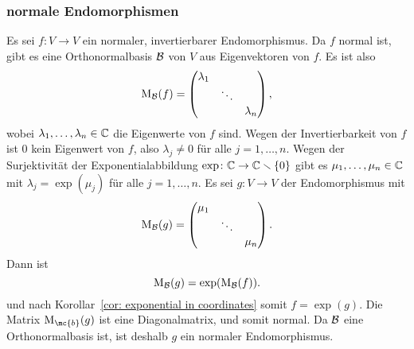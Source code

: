 \documentclass[a4paper, 10pt, numbers=noenddot]{scrartcl}
\begin{document}
\subsubsection{normale Endomorphismen}
Es sei $f \colon V \to V$ ein normaler, invertierbarer Endomorphismus.
Da $f$ normal ist, gibt es eine Orthonormalbasis $\mathcal{B}$ von $V$ aus Eigenvektoren von $f$.
Es ist also
\[
  \operatorname{M}_{\mathcal{B}}(f)
  =
  \begin{pmatrix}
    \lambda_1 &         &           \\
              & \ddots  &           \\
              &         & \lambda_n
  \end{pmatrix},
\]
wobei $\lambda_1, \dotsc, \lambda_n \in \mathbb{C}$ die Eigenwerte von $f$ sind.
Wegen der Invertierbarkeit von $f$ ist $0$ kein Eigenwert von $f$, also $\lambda_j \neq 0$ für alle $j = 1, \dotsc, n$.
Wegen der Surjektivität der Exponentialabbildung $\exp \colon \mathbb{C} \to \mathbb{C} \smallsetminus \{0\}$ gibt es $\mu_1, \dotsc, \mu_n \in \mathbb{C}$ mit $\lambda_j = \exp(\mu_j)$ für alle $j = 1, \dotsc, n$.
Es sei $g \colon V \to V$ der Endomorphismus mit
\[
  \operatorname{M}_{\mathcal{B}}(g)
  =
  \begin{pmatrix}
    \mu_1 &         &       \\
          & \ddots  &       \\
          &         & \mu_n
  \end{pmatrix}.
\]
Dann ist
\[
  \operatorname{M}_{\mathcal{B}}(g) = \exp( \operatorname{M}_{\mathcal{B}}(f) ).
\]
und nach Korollar~\ref{cor: exponential in coordinates} somit $f = \exp(g)$.
Die Matrix $\Mat_\mc{b}(g)$ ist eine Diagonalmatrix, und somit normal.
Da $\mathcal{B}$ eine Orthonormalbasis ist, ist deshalb $g$ ein normaler Endomorphismus.
\end{document}
